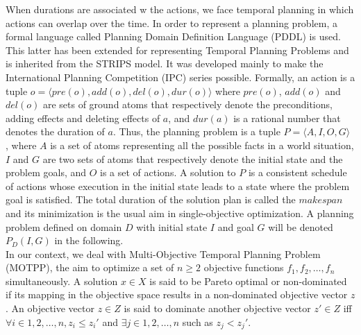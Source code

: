 \documentclass{llncs}
\begin{document}
When durations are associated  w the  actions, we face temporal planning in which  actions  can overlap over the time.
In order to  represent a planning problem,  a  formal language  called Planning Domain Definition  Language (PDDL) is used. This latter  has been extended for representing Temporal Planning Problems and is inherited from the STRIPS model.
It was developed mainly to make the International Planning
Competition (IPC) series possible.
Formally,  an action is a tuple $o =\langle pre(o), add(o), del(o), dur(o)\rangle$ where $pre(o)$, $add(o)$ and $del(o)$ are sets of ground atoms that respectively denote the preconditions, adding effects and deleting effects of $a$, and $dur(a)$ is a rational number
that denotes the duration of $a$.   Thus, the planning problem is a tuple $P = \langle A, I, O, G \rangle$ , where $A$ is a set of
atoms representing all the possible facts in a world situation, $I$ and $G$ are two sets of atoms that respectively denote the initial state and the problem goals, and $O$ is a set of actions.
A solution to $P$ is a consistent schedule of  actions whose execution in the initial state leads to a state where the problem goal is satisfied. 
The total duration of the solution plan is called the $makespan$ and its minimization is the usual aim  in single-objective optimization. 
A planning problem defined on domain $D$ with initial state $I$ and goal $G$ will be denoted $P_\textit{D} (I, G)$ in the following.\\
\indent In our context, we deal with Multi-Objective Temporal Planning Problem (MOTPP), the aim to optimize a set of $n \geq 2$ objective functions $f_1 ,f_2, \dots, f_n$ simultaneously.
A solution $x \in  X $ is said to be  Pareto optimal or  non-dominated  if its mapping in the objective space results in a non-dominated objective vector $z$. 
An objective vector $z \in Z$ is said to dominate  another objective vector $z' \in Z $ iff  $ \forall i \in {1, 2,\dots, n}, z_i \leq z_i'$ and
$\exists j \in {1, 2, \dots, n}$ such as $z_j < z_j'$. \\%
\end{document}
